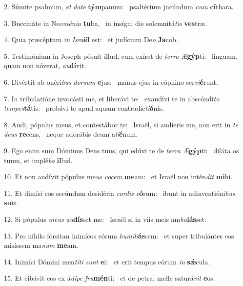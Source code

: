2. Súmite psalmum, \textit{et} \textit{da}\textit{te} \textbf{tým}panum: \ast\  psaltérium jucúndum \textit{cum} \textbf{cí}thara.\

3. Buccináte in Neo\textit{mé}\textit{ni}\textit{a} \textbf{tu}ba, \ast\  in insígni die solemnitá\textit{tis} \textbf{ves}træ.\

4. Quia præcéptum \textit{in} \textit{Is}\textit{ra}\textbf{ël} est: \ast\  et judícium De\textit{o} \textbf{Ja}cob.\

5. Testimónium in Joseph pósuit illud, cum exíret de \textit{ter}\textit{ra} \textit{Æ}\textbf{gýp}ti: \ast\  linguam, quam non nóverat, \textit{au}\textbf{dí}vit.\

6. Divértit ab onéri\textit{bus} \textit{dor}\textit{sum} \textbf{e}jus: \ast\  manus ejus in cóphino ser\textit{vi}\textbf{é}runt.\

7. In tribulatióne invocásti me, et liberávi te: \dag\  exaudívi te in abscóndi\textit{to} \textit{tem}\textit{pes}\textbf{tá}tis: \ast\  probávi te apud aquam contradic\textit{ti}\textbf{ó}nis.\

8. Audi, pópulus meus, et contestábor te: \dag\  Israël, si audíeris me, non erit in \textit{te} \textit{de}\textit{us} \textbf{re}cens, \ast\  neque adorábis deum a\textit{li}\textbf{é}num.\

9. Ego enim sum Dóminus Deus tuus, qui edúxi te de \textit{ter}\textit{ra} \textit{Æ}\textbf{gýp}ti: \ast\  diláta os tuum, et implé\textit{bo} \textbf{il}lud.\

10. Et non audívit pópulus me\textit{us} \textit{vo}\textit{cem} \textbf{me}am: \ast\  et Israël non intén\textit{dit} \textbf{mi}hi.\

11. Et dimísi eos secúndum desidéria \textit{cor}\textit{dis} \textit{e}\textbf{ó}rum: \ast\  ibunt in adinventióni\textit{bus} \textbf{su}is.\

12. Si pópulus \textit{me}\textit{us} \textit{au}\textbf{dís}set me: \ast\  Israël si in viis meis am\textit{bu}\textbf{lás}set:\

13. Pro níhilo fórsitan inimícos eórum \textit{hu}\textit{mi}\textit{li}\textbf{ás}sem: \ast\  et super tribulántes eos misíssem ma\textit{num} \textbf{me}am.\

14. Inimíci Dómini men\textit{tí}\textit{ti} \textit{sunt} \textbf{e}i: \ast\  et erit tempus eórum \textit{in} \textbf{sǽ}cula.\

15. Et cibávit eos ex á\textit{di}\textit{pe} \textit{fru}\textbf{mén}ti: \ast\  et de petra, melle saturá\textit{vit} \textbf{e}os.\

